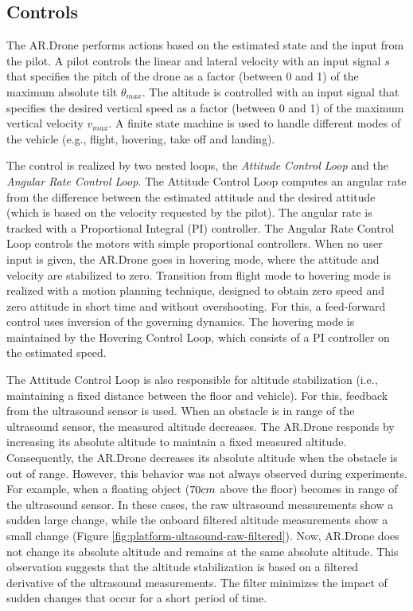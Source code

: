 \subsection{Controls}
\label{sec:platform-controls}
The AR.Drone performs actions based on the estimated state and the input from the pilot.
A pilot controls the linear and lateral velocity with an input signal $s$ that specifies the pitch of the drone as a factor (between 0 and 1) of the maximum absolute tilt $\theta_{max}$.
The altitude is controlled with an input signal that specifies the desired vertical speed as a factor (between 0 and 1) of the maximum vertical velocity $v_{max}$.
A finite state machine is used to handle different modes of the vehicle (e.g., flight, hovering, take off and landing).

The control is realized by two nested loops, the \textit{Attitude Control Loop} and the \textit{Angular Rate Control Loop}.
The Attitude Control Loop computes an angular rate from the difference between the estimated attitude and the desired attitude (which is based on the velocity requested by the pilot).
The angular rate is tracked with a Proportional Integral (PI) controller.
The Angular Rate Control Loop controls the motors with simple proportional controllers.
When no user input is given, the AR.Drone goes in hovering mode, where the attitude and velocity are stabilized to zero.
Transition from flight mode to hovering mode is realized with a motion planning technique, designed to obtain zero speed and zero attitude in short time and without overshooting.
For this, a feed-forward control uses inversion of the governing dynamics.
The hovering mode is maintained by the Hovering Control Loop, which consists of a PI controller on the estimated speed.

The Attitude Control Loop is also responsible for altitude stabilization (i.e., maintaining a fixed distance between the floor and vehicle).
For this, feedback from the ultrasound sensor is used.
When an obstacle is in range of the ultrasound sensor, the measured altitude decreases.
The AR.Drone responds by increasing its absolute altitude to maintain a fixed measured altitude.
Consequently, the AR.Drone decreases its absolute altitude when the obstacle is out of range.
However, this behavior was not always observed during experiments.
For example, when a floating object ($70\small{cm}$ above the floor) becomes in range of the ultrasound sensor.
In these cases, the raw ultrasound measurements show a sudden large change, while the onboard filtered altitude measurements show a small change (Figure \ref{fig:platform-ultasound-raw-filtered}).
Now, AR.Drone does not change its absolute altitude and remains at the same absolute altitude.
This observation suggests that the altitude stabilization is based on a filtered derivative of the ultrasound measurements.
The filter minimizes the impact of sudden changes that occur for a short period of time.

